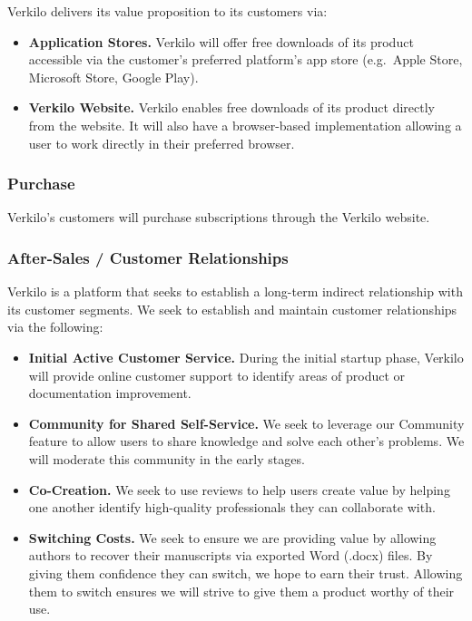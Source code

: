 \documentclass[10pt,openany]{book}
\providecommand{\tightlist}{%
  \setlength{\itemsep}{0pt}\setlength{\parskip}{0pt}}
\begin{document}
Verkilo delivers its value proposition to its customers via:

\begin{itemize}
\tightlist
\item
  \textbf{Application Stores.} Verkilo will offer free downloads of its
  product accessible via the customer's preferred platform's app store
  (e.g.~Apple Store, Microsoft Store, Google Play).
\item
  \textbf{Verkilo Website.} Verkilo enables free downloads of its
  product directly from the website. It will also have a browser-based
  implementation allowing a user to work directly in their preferred
  browser.
\end{itemize}

\hypertarget{purchase}{%
\subsubsection{Purchase}\label{purchase}}

Verkilo's customers will purchase subscriptions through the Verkilo
website.

\hypertarget{after-sales-customer-relationships}{%
\subsubsection{After-Sales / Customer
Relationships}\label{after-sales-customer-relationships}}

Verkilo is a platform that seeks to establish a long-term indirect
relationship with its customer segments. We seek to establish and
maintain customer relationships via the following:

\begin{itemize}
\tightlist
\item
  \textbf{Initial Active Customer Service.} During the initial startup
  phase, Verkilo will provide online customer support to identify areas
  of product or documentation improvement.
\item
  \textbf{Community for Shared Self-Service.} We seek to leverage our
  Community feature to allow users to share knowledge and solve each
  other's problems. We will moderate this community in the early stages.
\item
  \textbf{Co-Creation.} We seek to use reviews to help users create
  value by helping one another identify high-quality professionals they
  can collaborate with.
\item
  \textbf{Switching Costs.} We seek to ensure we are providing value by
  allowing authors to recover their manuscripts via exported Word
  (.docx) files. By giving them confidence they can switch, we hope to
  earn their trust. Allowing them to switch ensures we will strive to
  give them a product worthy of their use.
\end{itemize}
\end{document}
